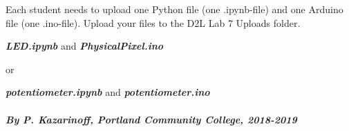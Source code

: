 \documentclass[11pt]{article}
\begin{document}
Each student needs to upload one Python file (one .ipynb-file) and one
Arduino file (one .ino-file). Upload your files to the D2L Lab 7 Uploads
folder.

\textbf{\emph{LED.ipynb}} and \textbf{\emph{PhysicalPixel.ino}}

or

\textbf{\emph{potentiometer.ipynb}} and
\textbf{\emph{potentiometer.ino}}

    \hypertarget{by-p.-kazarinoff-portland-community-college-2018-2019}{%
\paragraph{\texorpdfstring{\emph{By P. Kazarinoff, Portland Community
College,
2018-2019}}{By P. Kazarinoff, Portland Community College, 2018-2019}}\label{by-p.-kazarinoff-portland-community-college-2018-2019}}


    
    
    
\end{document}
